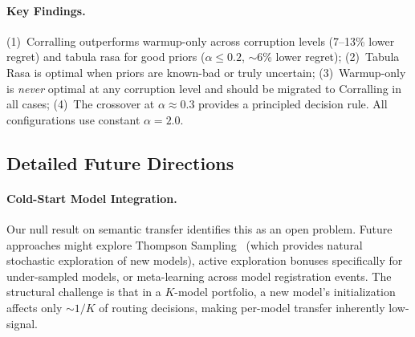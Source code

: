 \paragraph{Key Findings.}
(1)~Corralling outperforms warmup-only across corruption levels
(7--13\% lower regret) and tabula rasa for good priors
($\alpha \leq 0.2$, ${\sim}$6\% lower regret);
(2)~Tabula Rasa is optimal when priors are known-bad or truly uncertain;
(3)~Warmup-only is \emph{never} optimal at any corruption level and should
be migrated to Corralling in all cases;
(4)~The crossover at $\alpha \approx 0.3$ provides a principled decision rule.
All configurations use constant $\alpha=2.0$.


\subsection{Detailed Future Directions}
\label{sec:future_work_detailed}

\paragraph{Cold-Start Model Integration.}
Our null result on semantic transfer identifies this as an open problem. Future approaches might explore Thompson Sampling~\cite{agrawal2013thompson} (which provides natural stochastic exploration of new models), active exploration bonuses specifically for under-sampled models, or meta-learning across model registration events. The structural challenge is that in a $K$-model portfolio, a new model's initialization affects only ${\sim}1/K$ of routing decisions, making per-model transfer inherently low-signal.

